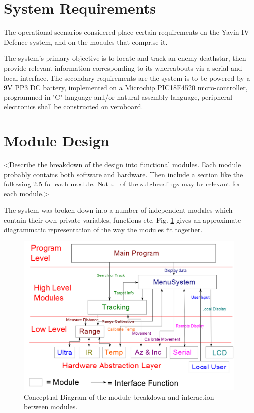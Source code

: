 \documentclass[]{report}
\begin{document}
\section{System Requirements}
The operational scenarios considered place certain requirements on the Yavin IV Defence system, and on the modules that comprise it.

The system's primary objective is to locate and track an enemy deathstar, then provide relevant information corresponding to its whereabouts via a serial and local interface. The secondary requirements are the system is to be powered by a 9V PP3 DC battery, implemented on a Microchip PIC18F4520 micro-controller, programmed in "C" language and/or natural assembly language, peripheral electronics shall be constructed on veroboard.  

\section{Module Design}
<Describe the breakdown of the design into functional modules. Each module probably contains both software and hardware.
Then include a section like the following 2.5 for each module. Not all of the sub-headings may be relevant for each module.>

The system was broken down into a number of independent modules which contain their own private variables, functions etc. Fig. \ref{fig:Modules} gives an approximate diagrammatic representation of the way the modules fit together.

\begin{figure}
\centering
\includegraphics[width=0.7\linewidth]{../Diagrams/Modules}
\caption[Modules]{Conceptual Diagram of the module breakdown and interaction between modules.}
\label{fig:Modules}
\end{figure}
\end{document}
